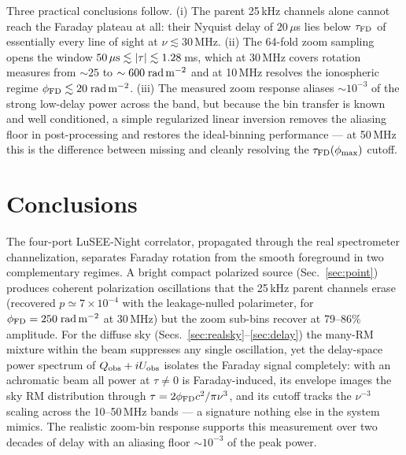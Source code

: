 \documentclass[11pt]{article}
\newcommand{\fd}{\phi_{\rm FD}}
\newcommand{\Qobs}{Q_{\rm obs}}
\newcommand{\Uobs}{U_{\rm obs}}
\begin{document}
Three practical conclusions follow.  (i) The parent 25\,kHz channels
alone cannot reach the Faraday plateau at all: their Nyquist delay of
$20\,\mu$s lies below $\tau_{\rm FD}$ of essentially every line of
sight at $\nu \lesssim 30$\,MHz.  (ii) The 64-fold zoom sampling opens
the window $50\,\mu{\rm s} \lesssim |\tau| \lesssim 1.28$\,ms, which
at 30\,MHz covers rotation measures from $\sim 25$ to
$\sim 600\;{\rm rad\,m^{-2}}$ and at 10\,MHz resolves the ionospheric
regime $\fd \lesssim 20\;{\rm rad\,m^{-2}}$.  (iii) The measured zoom
response aliases $\sim 10^{-3}$ of the strong low-delay power across
the band, but because the bin transfer is known and well conditioned,
a simple regularized linear inversion removes the aliasing floor in
post-processing and restores the ideal-binning performance — at
50\,MHz this is the difference between missing and cleanly resolving
the $\tau_{\rm FD}(\phi_{\max})$ cutoff.

\section{Conclusions}
\label{sec:conclusions}

The four-port LuSEE-Night correlator, propagated through the real
spectrometer channelization, separates Faraday rotation from the
smooth foreground in two complementary regimes.  A bright compact
polarized source (Sec.~\ref{sec:point}) produces coherent
polarization oscillations that the 25\,kHz parent channels erase
(recovered $p \simeq 7\times10^{-4}$ with the leakage-nulled
polarimeter, for $\fd = 250\;{\rm rad\,m^{-2}}$ at 30\,MHz) but the
zoom sub-bins recover at 79--86\% amplitude.  For
the diffuse sky (Secs.~\ref{sec:realsky}--\ref{sec:delay}) the
many-RM mixture within the beam suppresses any single oscillation,
yet the delay-space power spectrum of $\Qobs + i\Uobs$ isolates the
Faraday signal completely: with an achromatic beam all power at
$\tau \neq 0$ is Faraday-induced, its envelope images the sky RM
distribution through $\tau = 2\fd c^2/\pi\nu^3$, and its cutoff
tracks the $\nu^{-3}$ scaling across the 10--50\,MHz bands — a
signature nothing else in the system mimics.  The realistic zoom-bin
response supports this measurement over two decades of delay with an
aliasing floor $\sim 10^{-3}$ of the peak power.
\end{document}
